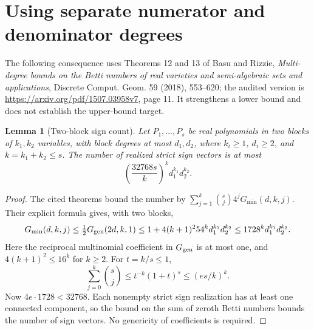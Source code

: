 \documentclass[11pt]{article}
\newtheorem{lemma}[proposition]{Lemma}
\begin{document}
\section{Using separate numerator and denominator degrees}

The following consequence uses Theorems 12 and 13 of Basu and Rizzie,
\emph{Multi-degree bounds on the Betti numbers of real varieties and
semi-algebraic sets and applications}, Discrete Comput. Geom. 59
(2018), 553--620; the audited version is
\url{https://arxiv.org/pdf/1507.03958v7}, page 11.
It strengthens a lower bound and does not establish the upper-bound target.

\begin{lemma}[Two-block sign count]
Let $P_1,\ldots,P_s$ be real polynomials in two blocks of $k_1,k_2$
variables, with block degrees at most $d_1,d_2$, where $k_i\ge1$,
$d_i\ge2$, and $k=k_1+k_2\le s$. The number of realized strict sign
vectors is at most
\[
 \left(\frac{32768s}{k}\right)^k d_1^{k_1}d_2^{k_2}.
\]
\end{lemma}
\begin{proof}
The cited theorems bound the number by
$\sum_{j=1}^k\binom sj4^jG_{\min}(d,k,j)$.
Their explicit formula gives, with two blocks,
\[
 G_{\min}(d,k,j)\le \tfrac12G_{\rm gen}(2d,k,1)
 \le 1+4(k+1)^2 54^k d_1^{k_1}d_2^{k_2}
 \le 1728^k d_1^{k_1}d_2^{k_2}.
\]
Here the reciprocal multinomial coefficient in $G_{\rm gen}$ is at
most one, and $4(k+1)^2\le16^k$ for $k\ge2$.
For $t=k/s\le1$,
\[
 \sum_{j=0}^k\binom sj\le t^{-k}(1+t)^s\le(es/k)^k.
\]
Now $4e\cdot1728<32768$. Each nonempty strict sign realization has
at least one connected component, so the bound on the sum of zeroth
Betti numbers bounds the number of sign vectors. No genericity of
coefficients is required.
\end{proof}
\end{document}
